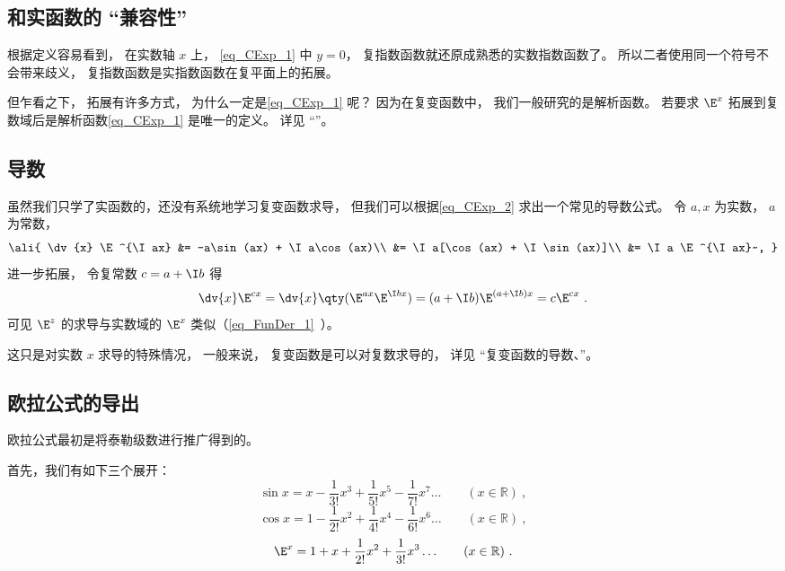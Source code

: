 \subsection{和实函数的 “兼容性”}
根据定义容易看到， 在实数轴 $x$ 上， \autoref{eq_CExp_1} 中 $y = 0$， 复指数函数就还原成熟悉的实数指数函数了。 所以二者使用同一个符号不会带来歧义， 复指数函数是实指数函数在复平面上的拓展。

但乍看之下， 拓展有许多方式， 为什么一定是\autoref{eq_CExp_1} 呢？ 因为在复变函数中， 我们一般研究的是解析函数。 若要求 $\E^x$ 拓展到复数域后是解析函数\autoref{eq_CExp_1} 是唯一的定义。 详见 “”。

\subsection{导数}
虽然我们只学了实函数的，还没有系统地学习复变函数求导， 但我们可以根据\autoref{eq_CExp_2} 求出一个常见的导数公式。 令 $a, x$ 为实数， $a$ 为常数，
\begin{equation}\ali{
\dv{x} \E^{\I ax} &= -a\sin(ax) + \I a\cos(ax)\\
&= \I a[\cos(ax) + \I \sin(ax)]\\
&= \I a \E^{\I ax}~,
}\end{equation}
进一步拓展， 令复常数 $c = a + \I b$ 得
\begin{equation}
\dv{x}\E^{c x} = \dv{x} \qty(\E^{ax}\E^{\I bx}) = (a + \I b)\E^{(a+\I b)x} = c\E^{cx}~.
\end{equation}
可见 $\E^z$ 的求导与实数域的 $\E^x$ 类似（\autoref{eq_FunDer_1}~）。

这只是对实数 $x$ 求导的特殊情况， 一般来说， 复变函数是可以对复数求导的， 详见 “复变函数的导数、”。

\subsection{欧拉公式的导出}

欧拉公式最初是将泰勒级数进行推广得到的。

首先，我们有如下三个展开：
\begin{equation}\label{eq_CExp_3}
\sin x = x - \frac{1}{3!} x^3 + \frac{1}{5!} x^5 - \frac{1}{7!} x^7 \ldots
\qquad (x \in \mathbb R)~,
\end{equation}
\begin{equation}\label{eq_CExp_5}
\cos x = 1 - \frac{1}{2!} x^2 + \frac{1}{4!} x^4 -\frac{1}{6!} x^6 \ldots
\qquad (x \in \mathbb R)~,
\end{equation}
\begin{equation}
\E^x =1 + x + \frac{1}{2!} x^2 + \frac{1}{3!} x^3  \ldots
\qquad (x \in \mathbb R)~.
\end{equation}


